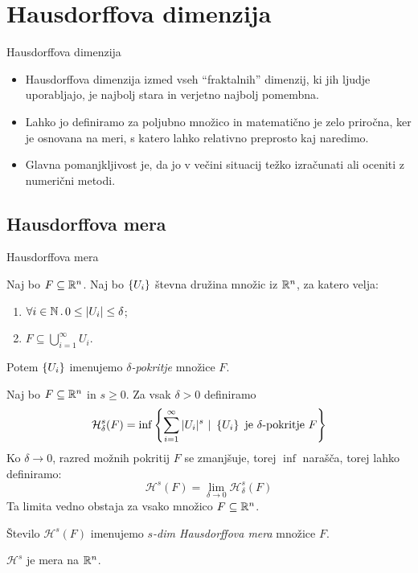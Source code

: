 \documentclass[10pt]{beamer}
\begin{document}
\section{Hausdorffova dimenzija}
\begin{frame}{Hausdorffova dimenzija}
    \begin{itemize}
        \item Hausdorffova dimenzija izmed vseh "`fraktalnih"' dimenzij, ki jih ljudje uporabljajo, je najbolj stara in verjetno najbolj pomembna. 
        \item Lahko jo definiramo za poljubno množico in matematično je zelo priročna, ker je osnovana na meri, s katero lahko relativno preprosto kaj naredimo.
        \item Glavna pomanjkljivost je, da jo v večini situacij težko izračunati ali oceniti z numerični metodi.
    \end{itemize}
\end{frame}

\subsection{Hausdorffova mera}
\begin{frame}[t]{Hausdorffova mera}
     {
        \begin{definicija}
            Naj bo \(F \subseteq \mathbb{R}^n\). Naj bo \(\left\{U_i\right\}\) števna družina množic iz \(\mathbb{R}^n\), za katero velja:
            \begin{enumerate}
                \item \(\forall i \in \mathbb{N} \,.\, 0 \leq |U_i| \leq \delta\);
                \item \(F \subseteq \bigcup_{i=1}^\infty U_i\).
            \end{enumerate}
            Potem \(\left\{U_i\right\}\) imenujemo \emph{\(\delta\)-pokritje} množice \(F\).
        \end{definicija}
    }
    \pause
    Naj bo \(F \subseteq \mathbb{R}^n\) in \(s \geq 0\). Za vsak \(\delta > 0\) definiramo 
    \[\mathcal{H}^s_\delta(F) = \inf \left\{\sum_{i=1}^{\infty}|U_i|^s \ | \ \left\{U_i\right\} \ \text{je \(\delta\)-pokritje \(F\)}\right\}\]
    \pause
    Ko \(\delta \to 0\), razred možnih pokritij \(F\) se zmanjšuje, torej \(\inf\) narašča, torej lahko definiramo:
    \[\mathcal{H}^s(F) = \lim_{\delta \to 0} \mathcal{H}^s_\delta(F)\]
    Ta limita vedno obstaja za vsako množico \(F \subseteq \mathbb{R}^n\). 

    \pause    
    Število \(\mathcal{H}^s(F)\) imenujemo \emph{\(s\)-dim Hausdorffova mera} množice \(F\).

    \begin{trditev}
        \(\mathcal{H}^s\) je mera na \(\mathbb{R}^n\).
    \end{trditev}      
\end{frame}
\end{document}

